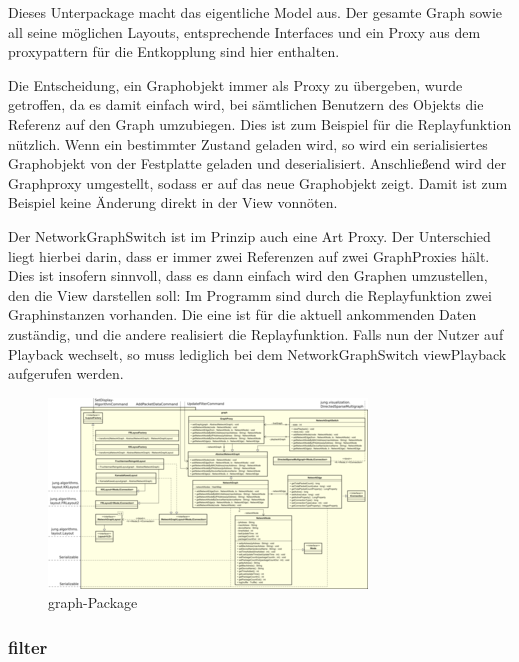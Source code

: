     Dieses Unterpackage macht das eigentliche Model aus. Der gesamte Graph sowie
    all seine möglichen Layouts, entsprechende Interfaces und ein Proxy aus dem
    \gls{proxypattern} für die Entkopplung sind hier enthalten.\par
    Die Entscheidung, ein Graphobjekt immer als Proxy zu übergeben, wurde getroffen, da es damit einfach wird,
    bei sämtlichen Benutzern des Objekts die Referenz auf den Graph umzubiegen. Dies ist zum Beispiel
    für die Replayfunktion nützlich. Wenn ein bestimmter Zustand geladen wird, so wird ein serialisiertes
    Graphobjekt von der Festplatte geladen und deserialisiert. Anschließend wird der Graphproxy
    umgestellt, sodass er auf das neue Graphobjekt zeigt. Damit ist zum Beispiel keine Änderung direkt in der View vonnöten.\par
    Der NetworkGraphSwitch ist im Prinzip auch eine Art Proxy. Der Unterschied liegt hierbei darin, dass
    er immer zwei Referenzen auf zwei GraphProxies hält. Dies ist insofern sinnvoll, dass es dann einfach wird
    den Graphen umzustellen, den die View darstellen soll: Im Programm sind durch die Replayfunktion zwei
    Graphinstanzen vorhanden. Die eine ist für die aktuell ankommenden Daten zuständig, und die andere realisiert
    die Replayfunktion. Falls nun der Nutzer auf Playback wechselt, so muss lediglich bei dem NetworkGraphSwitch
    viewPlayback aufgerufen werden.

    \clearpage
    \begin{figure}
      \centering
      \includegraphics[width=\textwidth]{../diagramimages/graph.png}
      \caption{graph-Package}
    \end{figure}
    \clearpage

    \subsubsection{filter}
    \label{subsubsec:filter}

